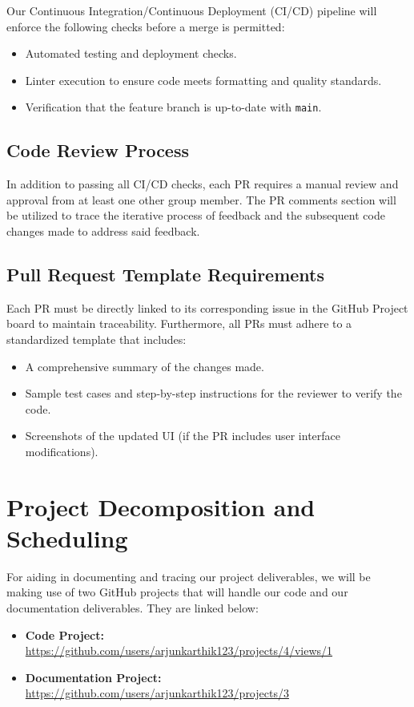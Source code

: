 \documentclass{article}
\begin{document}
Our Continuous Integration/Continuous Deployment (CI/CD) pipeline will enforce the following checks before a merge is permitted:
\begin{itemize}
    \item Automated testing and deployment checks.
    \item Linter execution to ensure code meets formatting and quality standards.
    \item Verification that the feature branch is up-to-date with \texttt{main}.
\end{itemize}

\subsection{Code Review Process}
In addition to passing all CI/CD checks, each PR requires a manual review and approval from at least one other group member. The PR comments section will be utilized to trace the iterative process of feedback and the subsequent code changes made to address said feedback.

\subsection{Pull Request Template Requirements}
Each PR must be directly linked to its corresponding issue in the GitHub Project board to maintain traceability. Furthermore, all PRs must adhere to a standardized template that includes:
\begin{itemize}
    \item A comprehensive summary of the changes made.
    \item Sample test cases and step-by-step instructions for the reviewer to verify the code.
    \item Screenshots of the updated UI (if the PR includes user interface modifications).
\end{itemize}

\section{Project Decomposition and Scheduling}

For aiding in documenting and tracing our project deliverables, we will be making use of two GitHub projects that will handle our code and our documentation deliverables. They are linked below: 

\begin{itemize}
    \item \textbf{Code Project:} \url{https://github.com/users/arjunkarthik123/projects/4/views/1}
    \item \textbf{Documentation Project:} \url{https://github.com/users/arjunkarthik123/projects/3}
\end{itemize}
\end{document}
